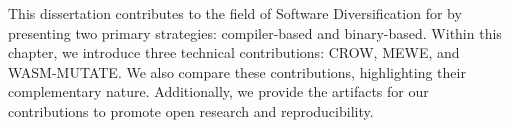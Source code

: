 This dissertation contributes to the field of Software Diversification for \Wasm by presenting two primary strategies: compiler-based and binary-based. 
Within this chapter, we introduce three technical contributions: CROW, MEWE, and WASM-MUTATE.
We also compare these contributions, highlighting their complementary nature.
Additionally, we provide the artifacts for our contributions to promote open research and reproducibility.
